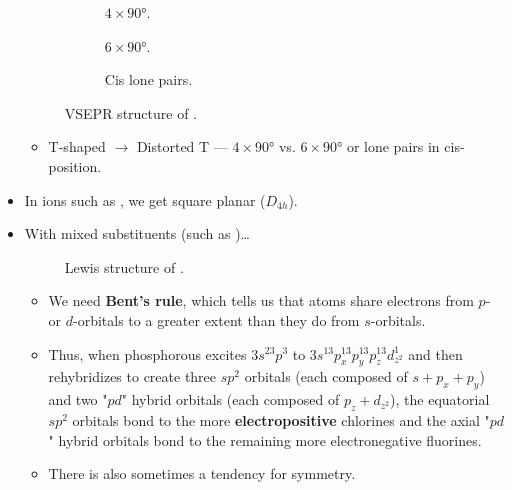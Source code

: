 \documentclass[../notes.tex]{subfiles}
\begin{document}
\begin{itemize}
\begin{figure}[h!]
\begin{subfigure}[b]{0.2\linewidth}
            \centering
            \caption{$4\times\ang{90}$.}
            \label{fig:VSEPR-BrF3a}
        \end{subfigure}
        \begin{subfigure}[b]{0.2\linewidth}
            \centering
            \caption{$6\times\ang{90}$.}
            \label{fig:VSEPR-BrF3b}
        \end{subfigure}
        \begin{subfigure}[b]{0.2\linewidth}
            \centering
            \caption{Cis lone pairs.}
            \label{fig:VSEPR-BrF3c}
        \end{subfigure}
        \caption{VSEPR structure of .}
        \label{fig:VSEPR-BrF3}
    \end{figure}
    \begin{itemize}
        \item T-shaped $\to$ Distorted T --- $4\times\ang{90}$ vs. $6\times\ang{90}$ or lone pairs in cis-position.
    \end{itemize}
    \item In ions such as , we get square planar ($D_{4h}$).
    \item With mixed substituents (such as )\dots
    \begin{figure}[h!]
        \centering
        \caption{Lewis structure of .}
        \label{fig:Lewis-PF2Cl3}
    \end{figure}
    \begin{itemize}
        \item We need \textbf{Bent's rule}, which tells us that atoms share electrons from $p$- or $d$-orbitals to a greater extent than they do from $s$-orbitals.
        \item Thus, when phosphorous excites $3s^23p^3$ to $3s^13p_x^13p_y^13p_z^13d_{z^2}^1$ and then rehybridizes to create three $sp^2$ orbitals (each composed of $s+p_x+p_y$) and two "$pd$" hybrid orbitals (each composed of $p_z+d_{z^2}$), the equatorial $sp^2$ orbitals bond to the more \textbf{electropositive} chlorines and the axial "$pd$" hybrid orbitals bond to the remaining more electronegative fluorines.
        \item There is also sometimes a tendency for symmetry.

\end{itemize}
\end{itemize}
\end{document}

